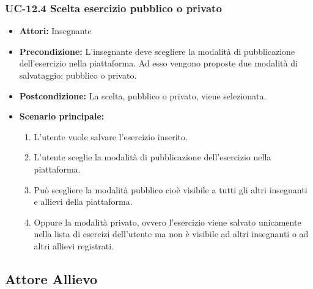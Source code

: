 \subsubsection{UC-12.4 Scelta esercizio pubblico o privato}
\begin{itemize}
\item \textbf{Attori: }Insegnante

\item \textbf{Precondizione: }L'insegnante deve scegliere la modalità di pubblicazione dell'esercizio nella piattaforma. Ad esso vengono proposte due modalità di salvataggio: pubblico o privato.
\item \textbf{Postcondizione: }La scelta, pubblico o privato, viene selezionata.
\item \textbf{Scenario principale: }
		\begin{enumerate}
		\item L'utente vuole salvare l'esercizio inserito.
		\item L'utente sceglie la modalità di pubblicazione dell'esercizio nella piattaforma. 
		\item Può scegliere la modalità pubblico cioè visibile a tutti gli altri insegnanti e allievi della piattaforma.
		\item Oppure la modalità privato, ovvero l'esercizio viene salvato unicamente nella lista di esercizi dell'utente ma non è visibile ad altri insegnanti o ad altri allievi registrati.
		\end{enumerate}
\end{itemize}

\newpage


					
					
					
\subsection{Attore Allievo}
	

